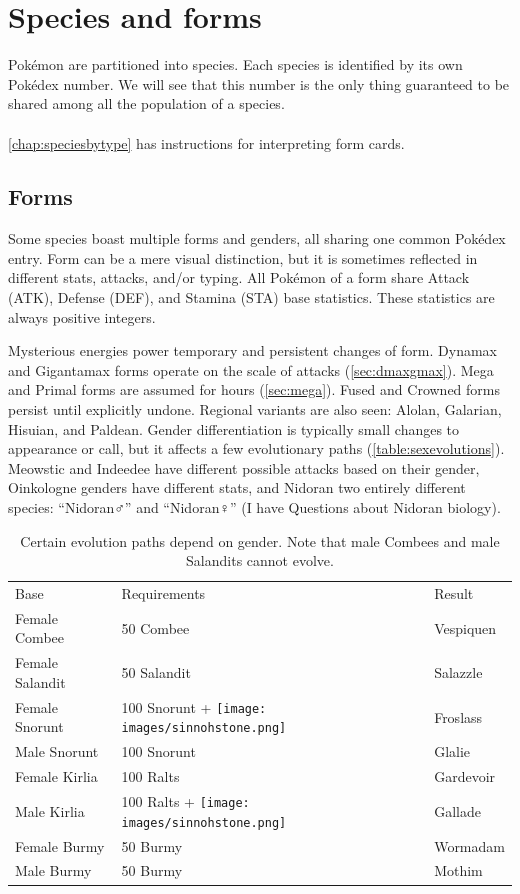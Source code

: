 \chapter{Species and forms\label{chap:species}}
Pokémon are partitioned into species.
Each species is identified by its own Pokédex number.
We will see that this number is the only thing guaranteed to be shared among all the population of a species.\\
\\
\autoref{chap:speciesbytype} has instructions for interpreting form cards.

\section{Forms\label{sec:forms}}
Some species boast multiple forms and genders, all sharing one common Pokédex entry.
Form can be a mere visual distinction, but it is sometimes reflected in different stats,
 attacks, and/or typing.
All Pokémon of a form share Attack (ATK), Defense (DEF), and Stamina (STA) base statistics.
These statistics are always positive integers.

Mysterious energies power temporary and persistent changes of form.
Dynamax and Gigantamax forms operate on the scale of attacks (\autoref{sec:dmaxgmax}).
Mega and Primal forms are assumed for hours (\autoref{sec:mega}).
Fused and Crowned forms persist until explicitly undone.
Regional variants are also seen: Alolan, Galarian, Hisuian, and Paldean.
Gender differentiation is typically small changes to appearance or call,
 but it affects a few evolutionary paths (\autoref{table:sexevolutions}).
Meowstic and Indeedee have different possible attacks based on their gender,
 Oinkologne genders have different stats, and Nidoran two entirely different
 species: ``Nidoran♂'' and ``Nidoran♀'' (I have Questions about Nidoran biology).
\begin{table}
\centering
\begin{tabular}{lll}
Base & Requirements & Result \\
\Midrule
Female Combee	& 50 Combee & Vespiquen\\
Female Salandit & 50 Salandit & Salazzle\\
Female Snorunt & 100 Snorunt + \texttt{[image: images/sinnohstone.png]} & Froslass\\
Male Snorunt & 100 Snorunt & Glalie\\
Female Kirlia & 100 Ralts & Gardevoir\\
Male Kirlia & 100 Ralts + \texttt{[image: images/sinnohstone.png]} & Gallade\\
Female Burmy & 50 Burmy & Wormadam\\
Male Burmy & 50 Burmy & Mothim\\
\end{tabular}
\caption[Gender-dependent evolutions]{Certain evolution paths depend on gender. Note that male Combees and male Salandits cannot evolve.\label{table:sexevolutions}}
\end{table}

